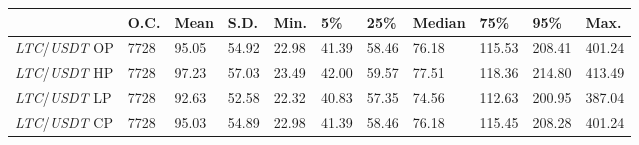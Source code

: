 \begin{tabular}{lllllllllll}
\toprule
 & \textbf{O.C.} & \textbf{Mean} & \textbf{S.D.} & \textbf{Min.} & \textbf{5\%} & \textbf{25\%} & \textbf{Median} & \textbf{75\%} & \textbf{95\%} & \textbf{Max.} \\
\midrule
\emph{LTC}/\emph{USDT} OP & 7728 & 95.05 & 54.92 & 22.98 & 41.39 & 58.46 & 76.18 & 115.53 & 208.41 & 401.24 \\
\emph{LTC}/\emph{USDT} HP & 7728 & 97.23 & 57.03 & 23.49 & 42.00 & 59.57 & 77.51 & 118.36 & 214.80 & 413.49 \\
\emph{LTC}/\emph{USDT} LP & 7728 & 92.63 & 52.58 & 22.32 & 40.83 & 57.35 & 74.56 & 112.63 & 200.95 & 387.04 \\
\emph{LTC}/\emph{USDT} CP & 7728 & 95.03 & 54.89 & 22.98 & 41.39 & 58.46 & 76.18 & 115.45 & 208.28 & 401.24 \\
\bottomrule
\end{tabular}
